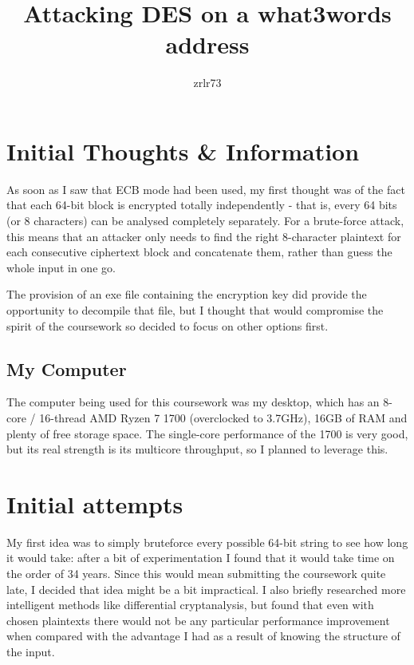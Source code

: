 \documentclass[11pt]{article} %
\title{\vspace{-1.6cm}Attacking DES on a what3words address}
\author{zrlr73}
\date{} %
\begin{document}
\maketitle



\section{Initial Thoughts \& Information}

As soon as I saw that ECB mode had been used, my first thought was of the fact that each 64-bit block is encrypted totally independently - that is, every 64 bits (or 8 characters) can be analysed completely separately. For a brute-force attack, this means that an attacker only needs to find the right 8-character plaintext for each consecutive ciphertext block and concatenate them, rather than guess the whole input in one go.

The provision of an exe file containing the encryption key did provide the opportunity to decompile that file, but I thought that would compromise the spirit of the coursework so decided to focus on other options first.

\subsection{My Computer}

The computer being used for this coursework was my desktop, which has an 8-core / 16-thread AMD Ryzen 7 1700 (overclocked to 3.7GHz), 16GB of RAM and plenty of free storage space. The single-core performance of the 1700 is very good, but its real strength is its multicore throughput, so I planned to leverage this.

\section{Initial attempts}

My first idea was to simply bruteforce every possible 64-bit string to see how long it would take: after a bit of experimentation I found that it would take time on the order of 34 years. Since this would mean submitting the coursework quite late, I decided that idea might be a bit impractical. I also briefly researched more intelligent methods like differential cryptanalysis, but found that even with chosen plaintexts there would not be any particular performance improvement when compared with the advantage I had as a result of knowing the structure of the input.
\end{document}
